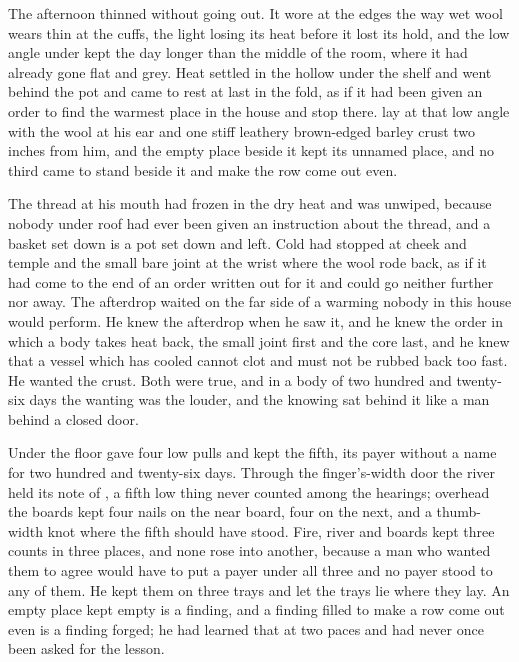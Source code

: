 The afternoon thinned without going out. It wore at the edges the way wet wool wears thin at the cuffs, the light losing its heat before it lost its hold, and the low angle under  kept the day longer than the middle of the room, where it had already gone flat and grey. Heat settled in the hollow under the shelf and went behind the pot and came to rest at last in the fold, as if it had been given an order to find the warmest place in the house and stop there.  lay at that low angle with the wool at his ear and one stiff leathery brown-edged barley crust two inches from him, and the empty place beside it kept its unnamed place, and no third came to stand beside it and make the row come out even.

The thread at his mouth had frozen in the dry heat and was unwiped, because nobody under  roof had ever been given an instruction about the thread, and a basket set down is a pot set down and left. Cold had stopped at cheek and temple and the small bare joint at the wrist where the wool rode back, as if it had come to the end of an order written out for it and could go neither further nor away. The afterdrop waited on the far side of a warming nobody in this house would perform. He knew the afterdrop when he saw it, and he knew the order in which a body takes heat back, the small joint first and the core last, and he knew that a vessel which has cooled cannot clot and must not be rubbed back too fast. He wanted the crust. Both were true, and in a body of two hundred and twenty-six days the wanting was the louder, and the knowing sat behind it like a man behind a closed door.

Under the floor  gave four low pulls and kept the fifth, its payer without a name for two hundred and twenty-six days. Through the finger's-width door the river held its note of , a fifth low thing never counted among the hearings; overhead the boards kept four nails on the near board, four on the next, and a thumb-width knot where the fifth should have stood. Fire, river and boards kept three counts in three places, and none rose into another, because a man who wanted them to agree would have to put a payer under all three and no payer stood to any of them. He kept them on three trays and let the trays lie where they lay. An empty place kept empty is a finding, and a finding filled to make a row come out even is a finding forged; he had learned that at two paces and had never once been asked for the lesson.

